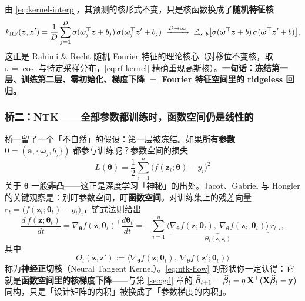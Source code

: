 由 \eqref{eq:kernel-interp}，其预测的核形式不变，只是核函数换成了\textbf{随机特征核}
\begin{equation}\label{eq:rf-kernel}
  k_{\mathrm{RF}}(\bm{z}, \bm{z}') = \frac{1}{D}\sum_{j=1}^D \sigma(\bm{\omega}_j^\top\bm{z}+b_j)\,\sigma(\bm{\omega}_j^\top\bm{z}'+b_j)
  \ \xrightarrow{D \to \infty}\ \mathbb{E}_{\bm{\omega}, b}\big[ \sigma(\bm{\omega}^\top\bm{z} + b)\,\sigma(\bm{\omega}^\top\bm{z}' + b) \big],
\end{equation}
这正是 Rahimi \& Recht 随机 Fourier 特征的理论核心（对移位不变核，取 $\sigma = \cos$ 与特定采样分布，\eqref{eq:rf-kernel} 精确重现高斯核）\cite{rahimi2007}。\textbf{一句话：冻结第一层、训练第二层、零初始化、梯度下降 $=$ Fourier 特征空间里的 ridgeless 回归。}

\subsubsection*{桥二：NTK——全部参数都训练时，函数空间仍是线性的}

桥一留了一个「不自然」的假设：第一层被冻结。如果\textbf{所有参数} $\bm{\theta} = (\bm{a}, \{ \bm{\omega}_j, b_j \})$ 都参与训练呢？参数空间的损失
\[
  L(\bm{\theta}) = \frac{1}{2}\sum_{i=1}^n \big( f(\bm{z}_i; \bm{\theta}) - y_i \big)^2
\]
关于 $\bm{\theta}$ 一般\textbf{非凸}——这正是深度学习「神秘」的出处。Jacot、Gabriel 与 Hongler 的关键观察是：别盯参数空间，盯\textbf{函数空间}。对训练集上的残差向量 $\bm{r}_t = \big( f(\bm{z}_i; \bm{\theta}_t) - y_i \big)_i$，链式法则给出
\begin{equation}\label{eq:ntk-flow}
  \frac{d\, f(\bm{z}; \bm{\theta}_t)}{dt}
  = \nabla_{\bm{\theta}} f(\bm{z}; \bm{\theta}_t)^\top \frac{d\bm{\theta}_t}{dt}
  = -\sum_{i=1}^n \underbrace{\big\langle \nabla_{\bm{\theta}} f(\bm{z}; \bm{\theta}_t),\ \nabla_{\bm{\theta}} f(\bm{z}_i; \bm{\theta}_t) \big\rangle}_{\Theta_t(\bm{z}, \bm{z}_i)} \, r_{t,i} ,
\end{equation}
其中
\begin{equation}\label{eq:ntk-def}
  \Theta_t(\bm{z}, \bm{z}') := \big\langle \nabla_{\bm{\theta}} f(\bm{z}; \bm{\theta}_t),\ \nabla_{\bm{\theta}} f(\bm{z}'; \bm{\theta}_t) \big\rangle
\end{equation}
称为\textbf{神经正切核}（Neural Tangent Kernel）。\eqref{eq:ntk-flow} 的形状你一定认得：它就是\textbf{函数空间里的核梯度下降}——与第 \ref{sec:gd} 章的 $\widehat{\bm{\beta}}_{t+1} = \widehat{\bm{\beta}}_t - \eta\,\mathbf{X}^\top(\mathbf{X}\widehat{\bm{\beta}}_t - \mathbf{y})$ 同构，只是「设计矩阵的内积」被换成了「参数梯度的内积」。

